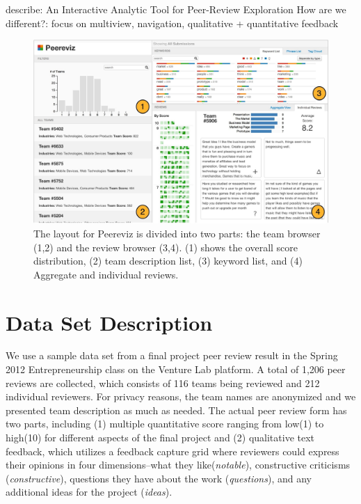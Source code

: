 \documentclass{sigchi}
\begin{document}
describe: An Interactive Analytic Tool for Peer-Review Exploration How are we
different?: focus on multiview, navigation, qualitative + quantitative feedback


\begin{figure}[!t]
\centering
\includegraphics[width=2.0\columnwidth]{images/overview-annotated}
\caption{The layout for Peereviz is divided into two parts:
the team browser (1,2) and the review browser (3,4).
(1) shows the overall score distribution,
(2) team description list,
(3) keyword list, and
(4) Aggregate and individual reviews.}
\label{fig:overview-annotated}
\end{figure}

\section{Data Set Description}
We use a sample data set from a final project peer review result in the Spring
2012 Entrepreneurship class on the Venture Lab platform. A total of 1,206 peer
reviews are collected, which consists of 116 teams being reviewed and 212
individual reviewers. For privacy reasons, the team names are anonymized and we
presented team description as much as needed. The actual peer review form has
two parts, including (1) multiple quantitative score ranging from low(1) to
high(10) for different aspects of the final project and (2) qualitative text
feedback, which utilizes a feedback capture grid \cite{dbootcamp} where
reviewers could express their opinions in four dimensions–what they
like(\emph{notable}), constructive criticisms (\emph{constructive}), questions
they have about the work (\emph{questions}), and any additional ideas for the
project (\emph{ideas}).
\end{document}
